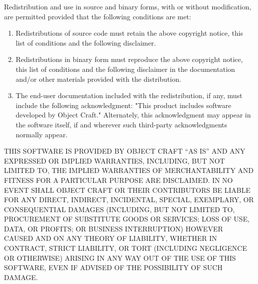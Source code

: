 \centerline{}

Redistribution and use in source and binary forms, with or without
modification, are permitted provided that the following conditions
are met:

\begin{enumerate}

\item
Redistributions of source code must retain the above copyright
notice, this list of conditions and the following disclaimer. 

\item
Redistributions in binary form must reproduce the above copyright
notice, this list of conditions and the following disclaimer in the
documentation and/or other materials provided with the distribution.

\item
The end-user documentation included with the redistribution, if any,
must include the following acknowledgment: "This product includes
software developed by Object Craft." Alternately, this
acknowledgment may appear in the software itself, if and wherever such
third-party acknowledgments normally appear.

\end{enumerate}

THIS SOFTWARE IS PROVIDED BY OBJECT CRAFT ``AS IS'' AND ANY EXPRESSED
OR IMPLIED WARRANTIES, INCLUDING, BUT NOT LIMITED TO, THE IMPLIED
WARRANTIES OF MERCHANTABILITY AND FITNESS FOR A PARTICULAR PURPOSE ARE
DISCLAIMED.  IN NO EVENT SHALL OBJECT CRAFT OR THEIR CONTRIBUTORS BE
LIABLE FOR ANY DIRECT, INDIRECT, INCIDENTAL, SPECIAL, EXEMPLARY, OR
CONSEQUENTIAL DAMAGES (INCLUDING, BUT NOT LIMITED TO, PROCUREMENT OF
SUBSTITUTE GOODS OR SERVICES; LOSS OF USE, DATA, OR PROFITS; OR
BUSINESS INTERRUPTION) HOWEVER CAUSED AND ON ANY THEORY OF LIABILITY,
WHETHER IN CONTRACT, STRICT LIABILITY, OR TORT (INCLUDING NEGLIGENCE
OR OTHERWISE) ARISING IN ANY WAY OUT OF THE USE OF THIS SOFTWARE, EVEN
IF ADVISED OF THE POSSIBILITY OF SUCH DAMAGE.
